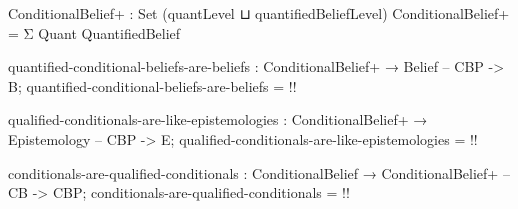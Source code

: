 \begin{code}
ConditionalBelief+ : Set (quantLevel ⊔ quantifiedBeliefLevel)
ConditionalBelief+ = Σ Quant QuantifiedBelief

quantified-conditional-beliefs-are-beliefs : ConditionalBelief+ → Belief -- CBP -> B;
quantified-conditional-beliefs-are-beliefs = {!!}

qualified-conditionals-are-like-epistemologies : ConditionalBelief+ → Epistemology -- CBP -> E;
qualified-conditionals-are-like-epistemologies = {!!}

conditionals-are-qualified-conditionals : ConditionalBelief → ConditionalBelief+ -- CB -> CBP;
conditionals-are-qualified-conditionals = {!!}
\end{code}
